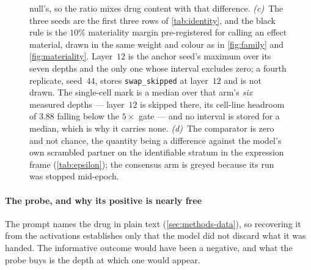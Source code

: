 \begin{figure}[htbp]
\begin{fullwidth}
{null's, so the ratio mixes drug content with that difference. \emph{(c)}~The
three seeds are the first three rows of \cref{tab:identity}, and the black rule
is the $10\%$ materiality margin pre-registered for calling an effect material,
drawn in the same weight and colour as in \cref{fig:family} and
\cref{fig:materiality}. Layer~$12$ is the anchor seed's maximum over its seven
depths and the only one whose interval excludes zero; a fourth replicate,
seed~$44$, stores \texttt{swap\_skipped} at layer~$12$ and is not drawn. The
single-cell mark is a median over that arm's \emph{six} measured depths ---
layer~$12$ is skipped there, its cell-line headroom of $3.88$ falling below the
$5\times$ gate --- and no interval is stored for a median, which is why it
carries none. \emph{(d)}~The comparator is zero and not chance, the quantity
being a difference against the model's own scrambled partner on the
identifiable stratum in the expression frame (\cref{tab:epsilon}); the
consensus arm is greyed because its run was stopped mid-epoch.}
\label{fig:comparators}
\end{fullwidth}
\end{figure}

\paragraph{The probe, and why its positive is nearly free} The prompt names the
drug in plain text (\cref{sec:methods-data}), so recovering it from the
activations establishes only that the model did not discard what it was handed.
The informative outcome would have been a negative, and what the probe buys is
the depth at which one would appear.

